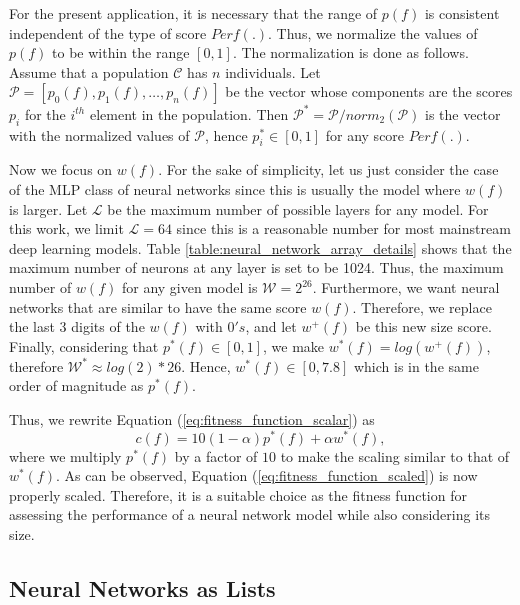 \documentclass[12pt]{elsart}%
\begin{document}
For the present application, it is necessary that the range of $p(f)$ is consistent independent of the type of score ${Perf}(.)$. Thus, we normalize the values of $p(f)$ to be within the range $[ 0,1]$. The normalization is done as follows. Assume that a population $\mathcal{C}$ has $n$ individuals. Let $\mathcal{P} = \left[ p_0(f), p_1(f), \ldots, p_n(f) \right]$ be the vector whose components are the scores $p_i$ for the $i^{th}$ element in the population. Then $\mathcal{P}^* = \mathcal{P}/norm_2(\mathcal{P})$ is the vector with the normalized values of $\mathcal{P}$, hence $p^*_i \in \left[ 0, 1 \right]$ for any score ${Perf}(.)$.

Now we focus on $w(f)$. For the sake of simplicity, let us just consider the case of the MLP class of neural networks since this is usually the model where $w(f)$ is larger. Let $\mathcal{L}$ be the maximum number of possible layers for any model. For this work, we limit $\mathcal{L} = 64$ since this is a reasonable number for most mainstream deep learning models. Table \ref{table:neural_network_array_details} shows that the maximum number of neurons at any layer is set to be 1024. Thus, the maximum number of $w(f)$ for any given model is $\mathcal{W} = 2^{26}$. Furthermore, we want neural networks that are similar to have the same score $w(f)$. Therefore, we replace the last 3 digits of the $w(f)$ with $0's$, and let $w^+(f)$ be this new size score. Finally, considering that $p^*(f) \in \left[ 0, 1 \right]$, we make $w^*(f) = log(w^+(f))$, therefore $\mathcal{W}^* \approx  log(2)*26$. Hence, $w^*(f) \in \left[0, 7.8\right]$ which is in the same order of magnitude as $p^*(f)$.

Thus, we rewrite Equation (\ref{eq:fitness_function_scalar}) as
\begin{equation}
c(f) = 10(1-\alpha)p^*(f) + \alpha w^*(f), 
\label{eq:fitness_function_scaled}
\end{equation}
where we multiply $p^*(f)$ by a factor of $10$ to make the scaling similar to that of $w^*(f)$. As can be observed, Equation (\ref{eq:fitness_function_scaled}) is now properly scaled. Therefore, it is a suitable choice as the fitness function for assessing the performance of a neural network model while also considering its size.

\subsection{Neural Networks as Lists}
\label{sec:encoding_nn}
\end{document}
